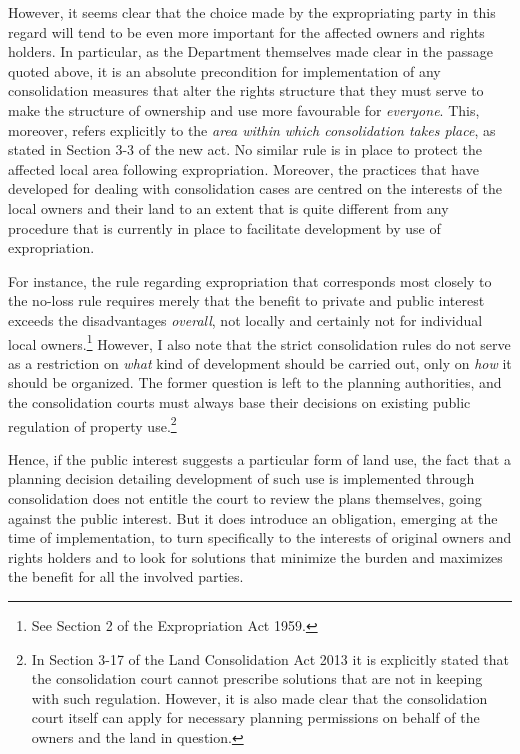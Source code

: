 However, it seems clear that the choice made by the expropriating party in this regard will tend to be even more important for the affected owners and rights holders. In particular, as the Department themselves made clear in the passage quoted above, it is an absolute precondition for implementation of any consolidation measures that alter the rights structure that they must serve to make the structure of ownership and use more favourable for \emph{everyone}. This, moreover, refers explicitly to the \emph{area within which consolidation takes place}, as stated in Section 3-3 of the new act. No similar rule is in place to protect the affected local area following expropriation. Moreover, the practices that have developed for dealing with consolidation cases are centred on the interests of the local owners and their land to an extent that is quite different from any procedure that is currently in place to facilitate development by use of expropriation.

For instance, the rule regarding expropriation that corresponds most closely to the no-loss rule  
requires merely that the benefit to private and public interest exceeds the disadvantages \emph{overall}, not locally and certainly not for individual local owners.\footnote{See Section 2 of the Expropriation Act 1959.} However, I also note that the strict consolidation rules do not serve as a restriction on \emph{what} kind of development should be carried out, only on \emph{how} it should be organized. The former question is left to the planning authorities, and the consolidation courts must always base their decisions on existing public regulation of property use.\footnote{In Section 3-17 of the Land Consolidation Act 2013 it is explicitly stated that the consolidation court cannot prescribe solutions that are not in keeping with such regulation. However, it is also made clear that the consolidation court itself can apply for necessary planning permissions on behalf of the owners and the land in question.}

Hence, if the public interest suggests a particular form of land use, the fact that a planning decision detailing development of such use is implemented through consolidation does not entitle the court to review the plans themselves, going against the public interest. But it does introduce an obligation, emerging at the time of implementation, to turn specifically to the interests of original owners and rights holders and to look for solutions that minimize the burden and maximizes the benefit for all the involved parties.

